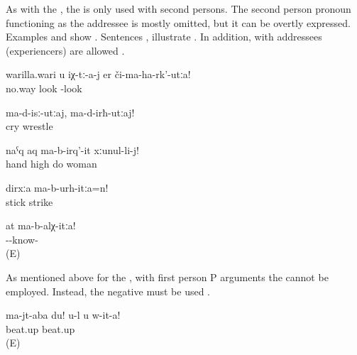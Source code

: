 As with the , the  is only used with second persons. The second person pronoun functioning as the addressee is mostly omitted, but it can be overtly expressed. Examples  and  show . Sentences ,  illustrate . In addition,  with  addressees (experiencers) are allowed .
%
\begin{exe}
	\ex	\label{ex:No way you look at them}
	\gll	warilla.wari	u	iχ-tː-a-j	er	či-ma-ha-rk'-utːa!\\
		no.way			look	-look\\
	\glt	{}

	\ex	\label{ex:Do not cry, do not wrestle}
	\gll	ma-d-isː-utːaj,		ma-d-irħ-utːaj!\\
		cry	wrestle\\
	\glt	{}

	\ex	\label{ex:Do not raise your hand against your wife}
	\gll	naˁq	aq	ma-b-irq'-it	xːunul-li-j!\\
		hand	high	do	woman\\
	\glt	{}

	\ex	\label{ex:Do not hit with a stick}
	\gll	dirxːa	ma-b-urh-itːa=n!\\
		stick	strike\\
	\glt	{}

	\ex	\label{ex:Do not know this}
	\gll	at	ma-b-alχ-itːa!\\
			--know-\\
	\glt	{} (E)
\end{exe}

As mentioned above for the , with first person P arguments the  cannot be employed. Instead, the negative  must be used .
%
\begin{exe}
	\ex	\label{ex:‎Do not thrash me}
	\gll	ma-jt-aba	du!	u-l	u	w-it-a!\\
		beat.up				beat.up\\
	\glt	{} (E)
\end{exe}

